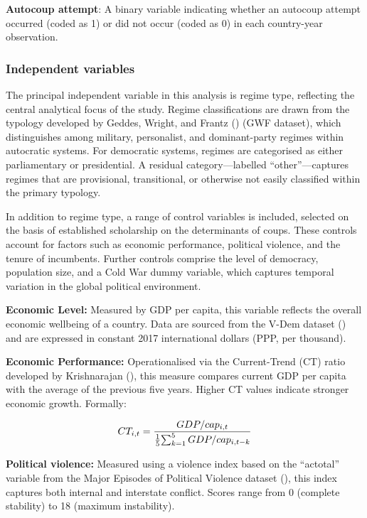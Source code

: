 \documentclass[
  12pt,
]{report}
\begin{document}
\textbf{Autocoup attempt}: A binary variable indicating whether an
autocoup attempt occurred (coded as 1) or did not occur (coded as 0) in
each country-year observation.

\subsubsection*{Independent variables}\label{independent-variables}

The principal independent variable in this analysis is regime type,
reflecting the central analytical focus of the study. Regime
classifications are drawn from the typology developed by Geddes, Wright,
and Frantz () (GWF dataset), which
distinguishes among military, personalist, and dominant-party regimes
within autocratic systems. For democratic systems, regimes are
categorised as either parliamentary or presidential. A residual
category---labelled ``other''---captures regimes that are provisional,
transitional, or otherwise not easily classified within the primary
typology.

In addition to regime type, a range of control variables is included,
selected on the basis of established scholarship on the determinants of
coups. These controls account for factors such as economic performance,
political violence, and the tenure of incumbents. Further controls
comprise the level of democracy, population size, and a Cold War dummy
variable, which captures temporal variation in the global political
environment.

\textbf{Economic Level:} Measured by GDP per capita, this variable
reflects the overall economic wellbeing of a country. Data are sourced
from the V-Dem dataset ()
and are expressed in constant 2017 international dollars (PPP, per
thousand).

\textbf{Economic Performance:} Operationalised via the Current-Trend
(CT) ratio developed by Krishnarajan
(), this measure compares current
GDP per capita with the average of the previous five years. Higher CT
values indicate stronger economic growth. Formally:

\[
    \begin{aligned}
    CT_{i,t} = {GDP/cap_{i,t} \over {1 \over 5} {\sum_{k=1}^5GDP/cap_{i,t-k}}}
    \end{aligned}
\]

\textbf{Political violence:} Measured using a violence index based on
the ``actotal'' variable from the Major Episodes of Political Violence
dataset (),
this index captures both internal and interstate conflict. Scores range
from 0 (complete stability) to 18 (maximum instability).
\end{document}
